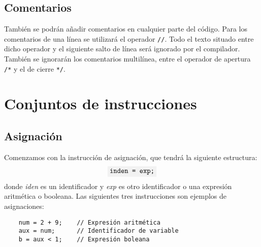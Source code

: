 \documentclass[10pt a4paper]{article}
\newcommand{\code}[1]{\colorbox{light-gray}{\texttt{#1}}}
\numberwithin{equation}{section}
\begin{document}
\subsection{Comentarios}
También se podrán añadir comentarios en cualquier parte del código. Para los comentarios de una línea se utilizará el operador \code{//}. Todo el texto situado entre dicho operador y el siguiente salto de línea será ignorado por el compilador.
También se ignorarán los comentarios multilínea, entre el operador de apertura \code{/*} y el de cierre \code{*/}.

\section{Conjuntos de instrucciones}
\subsection{Asignación}
Comenzamos con la instrucción de asignación, que tendrá la siguiente estructura:
\begin{equation*}
    \code{inden = exp;}
\end{equation*}
donde \textit{iden} es un identificador y \textit{exp} es otro identificador o una expresión aritmética o booleana. Las siguientes tres instrucciones son ejemplos de asignaciones:
\begin{verbatim}
    num = 2 + 9;    // Expresión aritmética
    aux = num;      // Identificador de variable
    b = aux < 1;    // Expresión boleana
\end{verbatim}


\newline
\end{document}
